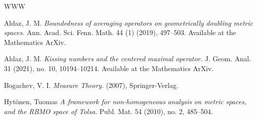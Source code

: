 \documentclass[12pt]{amsart}
\theoremstyle{definition}
\theoremstyle{parrafo}
\begin{document}
	\begin{thebibliography}{WWW}
		
	
		
		 Aldaz, J. M.
		{\em Boundedness of averaging operators on geometrically doubling metric spaces.}  Ann. Acad. Sci. Fenn. Math. 44 (1) (2019), 497--503. Available at the Mathematics ArXiv. 
		
  Aldaz, J. M.  {\em Kissing numbers and the centered maximal operator.} J. Geom. Anal. 31 (2021), no. 10, 10194--10214. Available at the Mathematics ArXiv.

		
		  Bogachev, V.  I. {\em Measure Theory.}
		(2007), 
		Springer-Verlag. 
		
	 
	
	  Hyt\"onen, Tuomas {\em A framework for non-homogeneous analysis on metric spaces, and the RBMO space of Tolsa.} Publ. Mat. 54 (2010), no. 2, 485--504.
	
		
		
	\end{thebibliography}
	
\end{document}

